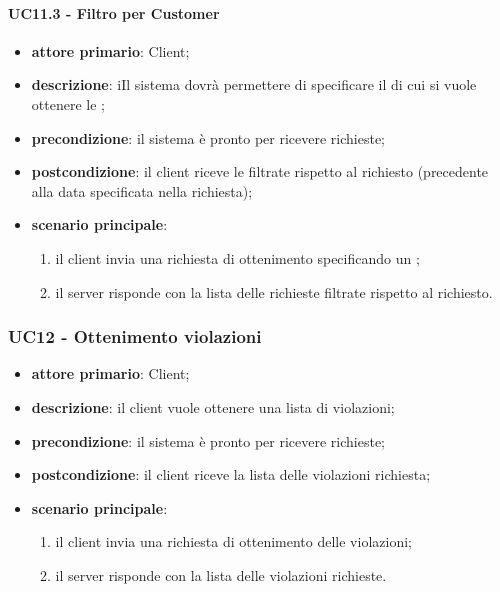 \paragraph{UC11.3 - Filtro per Customer}
\begin{itemize}
	\item \textbf{attore primario}: Client;
	\item \textbf{descrizione}: iIl sistema dovrà permettere di specificare il  di cui si vuole ottenere le ;
	\item \textbf{precondizione}:  il sistema è pronto per ricevere richieste;
	\item \textbf{postcondizione}: il client riceve le  filtrate rispetto al  richiesto (precedente alla data specificata nella richiesta);
	\item \textbf{scenario principale}: 
	\begin{enumerate}
		\item  il client invia una richiesta di ottenimento  specificando un ; 
		\item  il server risponde con la lista delle  richieste filtrate rispetto al  richiesto.
	\end{enumerate}
\end{itemize}

\subsubsection{UC12 - Ottenimento violazioni}
\begin{itemize}
	\item \textbf{attore primario}: Client;
	\item \textbf{descrizione}: il client vuole ottenere una lista di violazioni;
	\item \textbf{precondizione}:  il sistema è pronto per ricevere richieste;
	\item \textbf{postcondizione}: il client riceve la lista delle violazioni richiesta;
	\item \textbf{scenario principale}: 
	\begin{enumerate}
		\item il client invia una richiesta di ottenimento delle violazioni;
		\item il server risponde con la lista delle violazioni richieste.
	\end{enumerate}
\end{itemize}

